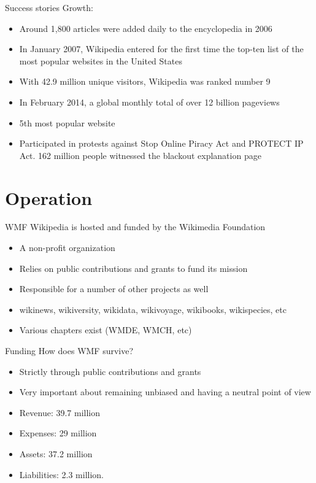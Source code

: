 \documentclass{beamer}
\begin{document}
\begin{frame} {Success stories}
	Growth:
	\begin{itemize}
		\pause \item Around 1,800 articles were added daily to the encyclopedia in 2006
		\pause \item In January 2007, Wikipedia entered for the first time the top-ten list of the most popular websites in the United States
		\pause \item With 42.9 million unique visitors, Wikipedia was ranked number 9
		\pause \item In February 2014, a global monthly total of over 12 billion pageviews
		\pause \item 5th most popular website
		\pause \item Participated in protests against Stop Online Piracy Act and PROTECT IP Act. 162 million people witnessed the blackout explanation page
	\end{itemize}
\end{frame}

\section{Operation}
\begin{frame} {WMF}
	Wikipedia is hosted and funded by the Wikimedia Foundation
	\begin{itemize}
		\pause \item A non-profit organization
		\pause \item Relies on public contributions and grants to fund its mission
		\pause \item Responsible for a number of other projects as well
		\pause \item wikinews, wikiversity, wikidata, wikivoyage, wikibooks, wikispecies, etc
		\pause \item Various chapters exist (WMDE, WMCH, etc)
	\end{itemize}
\end{frame}

\begin{frame} {Funding}
	How does WMF survive?
	\begin{itemize}
		\pause \item Strictly through public contributions and grants
		\pause \item Very important about remaining unbiased and having a neutral point of view
		\pause \item Revenue: 39.7 million
		\pause \item Expenses: 29 million
		\pause \item Assets: 37.2 million
		\pause \item Liabilities: 2.3 million.
	\end{itemize}
\end{frame}
\end{document}
